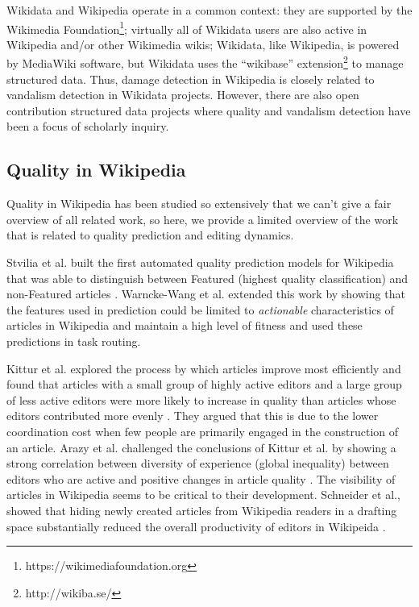 \documentclass{sig-alternate-2013}
\begin{document}
Wikidata and Wikipedia operate in a common context: they are supported by the Wikimedia Foundation\footnote{https://wikimediafoundation.org}; virtually all of Wikidata users are also active in Wikipedia and/or other Wikimedia wikis; Wikidata, like Wikipedia, is powered by MediaWiki software, but Wikidata uses the ``wikibase'' extension\footnote{http://wikiba.se/} to manage structured data. Thus, damage detection in Wikipedia is closely related to vandalism detection in Wikidata projects. However, there are also open contribution structured data projects where quality and vandalism detection have been a focus of scholarly inquiry.

\subsection{Quality in Wikipedia}
Quality in Wikipedia has been studied so extensively that we can't give a fair overview of all related work, so here, we provide a limited overview of the work that is related to quality prediction and editing dynamics.

Stvilia et al. built the first automated quality prediction models for Wikipedia that was able to distinguish between Featured (highest quality classification) and non-Featured articles \cite{stvilia:assessing}.  Warncke-Wang et al. extended this work by showing that the features used in prediction could be limited to \textit{actionable} characteristics of articles in Wikipedia and maintain a high level of fitness \cite{warncke:tell} and used these predictions in task routing.

Kittur et al. explored the process by which articles improve most efficiently and found that articles with a small group of highly active editors and a large group of less active editors were more likely to increase in quality than articles whose editors contributed more evenly \cite{kittur:harnessing}. They argued that this is due to the lower coordination cost when few people are primarily engaged in the construction of an article.  Arazy et al. challenged the conclusions of Kittur et al. by showing a strong correlation between diversity of experience (global inequality) between editors who are active and positive changes in article quality \cite{arazy:determinants}. The visibility of articles in Wikipedia seems to be critical to their development.  Schneider et al., showed that hiding newly created articles from Wikipedia readers in a drafting space substantially reduced the overall productivity of editors in Wikipeida \cite{schneider:accept}.
\end{document}

